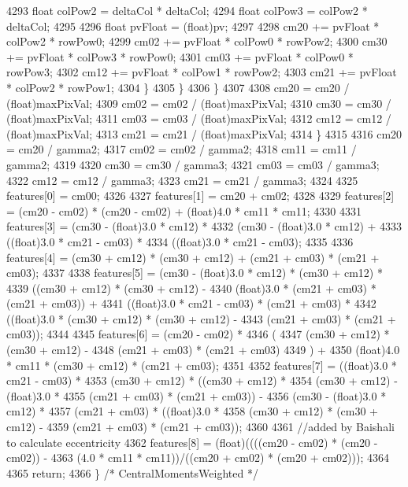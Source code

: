 \begin{DoxyCode}
4293           \textcolor{keywordtype}{float}  colPow2 = deltaCol * deltaCol;
4294           \textcolor{keywordtype}{float}  colPow3 = colPow2  * deltaCol;
4295 
4296           \textcolor{keywordtype}{float}  pvFloat = (float)pv;
4297 
4298           cm20 += pvFloat * colPow2 * rowPow0;
4299           cm02 += pvFloat * colPow0 * rowPow2;
4300           cm30 += pvFloat * colPow3 * rowPow0;
4301           cm03 += pvFloat * colPow0 * rowPow3;
4302           cm12 += pvFloat * colPow1 * rowPow2;
4303           cm21 += pvFloat * colPow2 * rowPow1;
4304         \}
4305       \}
4306     \}
4307 
4308     cm20 = cm20 / (float)maxPixVal;
4309     cm02 = cm02 / (float)maxPixVal;
4310     cm30 = cm30 / (float)maxPixVal;
4311     cm03 = cm03 / (float)maxPixVal;
4312     cm12 = cm12 / (float)maxPixVal;
4313     cm21 = cm21 / (float)maxPixVal;
4314   \}
4315 
4316   cm20 = cm20 / gamma2;
4317   cm02 = cm02 / gamma2;
4318   cm11 = cm11 / gamma2;
4319 
4320   cm30 = cm30 / gamma3;
4321   cm03 = cm03 / gamma3;
4322   cm12 = cm12 / gamma3;
4323   cm21 = cm21 / gamma3;
4324 
4325   features[0] = cm00;
4326 
4327   features[1] = cm20 + cm02;
4328  
4329   features[2] = (cm20 - cm02) * (cm20 - cm02) + (float)4.0 * cm11 * cm11;
4330 
4331   features[3] = (cm30 - (float)3.0 * cm12) * 
4332                 (cm30 - (float)3.0 * cm12) + 
4333                 ((float)3.0 * cm21 - cm03) * 
4334                 ((float)3.0 * cm21 - cm03);
4335 
4336   features[4] = (cm30 + cm12) * (cm30 + cm12) + (cm21 + cm03) * (cm21 + cm03);
4337 
4338   features[5] = (cm30 - (float)3.0 * cm12) * (cm30 + cm12) * 
4339                 ((cm30 + cm12) * (cm30 + cm12) - 
4340                 (\textcolor{keywordtype}{float})3.0 * (cm21 + cm03) * (cm21 + cm03)) +
4341                 ((\textcolor{keywordtype}{float})3.0 * cm21 - cm03) * (cm21 + cm03) * 
4342                 ((float)3.0 * (cm30 + cm12) * (cm30 + cm12) - 
4343                 (cm21 + cm03) * (cm21 + cm03));
4344 
4345   features[6] = (cm20 - cm02) * 
4346                 (
4347                  (cm30 + cm12) * (cm30 + cm12) - 
4348                  (cm21 + cm03) * (cm21 + cm03)
4349                 ) +
4350                 (float)4.0 * cm11 * (cm30 + cm12) * (cm21 + cm03);
4351 
4352   features[7] = ((float)3.0 * cm21 - cm03) * 
4353                 (cm30 + cm12) * ((cm30 + cm12) * 
4354                 (cm30 + cm12) - (\textcolor{keywordtype}{float})3.0 * 
4355                 (cm21 + cm03) * (cm21 + cm03)) -
4356                 (cm30 - (\textcolor{keywordtype}{float})3.0 * cm12) * 
4357                 (cm21 + cm03) * ((float)3.0 * 
4358                 (cm30 + cm12) * (cm30 + cm12) - 
4359                 (cm21 + cm03) * (cm21 + cm03));
4360 
4361 \textcolor{comment}{//added by Baishali to calculate eccentricity}
4362   features[8] = (float)((((cm20 - cm02) * (cm20 - cm02)) - 
4363                 (4.0 * cm11 * cm11))/((cm20 + cm02) * (cm20 + cm02)));
4364 
4365   \textcolor{keywordflow}{return};
4366 \}  \textcolor{comment}{/* CentralMomentsWeighted */}
\end{DoxyCode}
